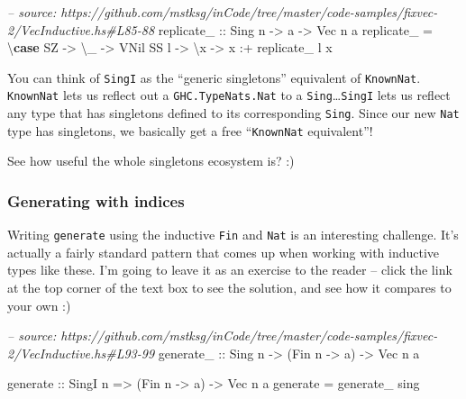 \documentclass[]{article}
\newenvironment{Shaded}{}{}
\newcommand{\KeywordTok}[1]{\textcolor[rgb]{0.00,0.44,0.13}{\textbf{#1}}}
\newcommand{\DataTypeTok}[1]{\textcolor[rgb]{0.56,0.13,0.00}{#1}}
\newcommand{\CommentTok}[1]{\textcolor[rgb]{0.38,0.63,0.69}{\textit{#1}}}
\newcommand{\OtherTok}[1]{\textcolor[rgb]{0.00,0.44,0.13}{#1}}
\newcommand{\FunctionTok}[1]{\textcolor[rgb]{0.02,0.16,0.49}{#1}}
\newcommand{\NormalTok}[1]{#1}
\begin{document}
\begin{Shaded}
\begin{Highlighting}[]
\CommentTok{-- source: https://github.com/mstksg/inCode/tree/master/code-samples/fixvec-2/VecInductive.hs#L85-88}
\OtherTok{replicate_ ::} \DataTypeTok{Sing}\NormalTok{ n }\OtherTok{->}\NormalTok{ a }\OtherTok{->} \DataTypeTok{Vec}\NormalTok{ n a}
\NormalTok{replicate_ }\FunctionTok{=}\NormalTok{ \textbackslash{}}\KeywordTok{case}
    \DataTypeTok{SZ}   \OtherTok{->}\NormalTok{ \textbackslash{}_ }\OtherTok{->} \DataTypeTok{VNil}
    \DataTypeTok{SS}\NormalTok{ l }\OtherTok{->}\NormalTok{ \textbackslash{}x }\OtherTok{->}\NormalTok{ x }\FunctionTok{:+}\NormalTok{ replicate_ l x}
\end{Highlighting}
\end{Shaded}

You can think of \texttt{SingI} as the ``generic singletons'' equivalent of
\texttt{KnownNat}. \texttt{KnownNat} lets us reflect out a
\texttt{GHC.TypeNats.Nat} to a \texttt{Sing}\ldots{}\texttt{SingI} lets us
reflect any type that has singletons defined to its corresponding \texttt{Sing}.
Since our new \texttt{Nat} type has singletons, we basically get a free
``\texttt{KnownNat} equivalent''!

See how useful the whole singletons ecosystem is? :)

\subsubsection{Generating with indices}\label{generating-with-indices-1}

Writing \texttt{generate} using the inductive \texttt{Fin} and \texttt{Nat} is
an interesting challenge. It's actually a fairly standard pattern that comes up
when working with inductive types like these. I'm going to leave it as an
exercise to the reader -- click the link at the top corner of the text box to
see the solution, and see how it compares to your own :)

\begin{Shaded}
\begin{Highlighting}[]
\CommentTok{-- source: https://github.com/mstksg/inCode/tree/master/code-samples/fixvec-2/VecInductive.hs#L93-99}
\OtherTok{generate_ ::} \DataTypeTok{Sing}\NormalTok{ n }\OtherTok{->}\NormalTok{ (}\DataTypeTok{Fin}\NormalTok{ n }\OtherTok{->}\NormalTok{ a) }\OtherTok{->} \DataTypeTok{Vec}\NormalTok{ n a}


\OtherTok{generate ::} \DataTypeTok{SingI}\NormalTok{ n }\OtherTok{=>}\NormalTok{ (}\DataTypeTok{Fin}\NormalTok{ n }\OtherTok{->}\NormalTok{ a) }\OtherTok{->} \DataTypeTok{Vec}\NormalTok{ n a}
\NormalTok{generate }\FunctionTok{=}\NormalTok{ generate_ sing}
\end{Highlighting}
\end{Shaded}
\end{document}
